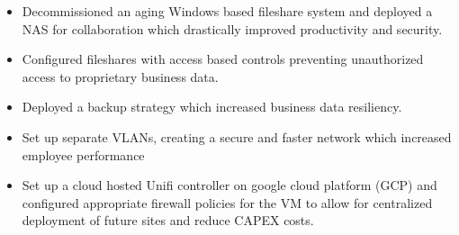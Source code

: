 \divider

\begin{itemize}
    \item Decommissioned an aging Windows based fileshare system and deployed a NAS for collaboration which drastically improved productivity and security.
    \item Configured fileshares with access based controls preventing unauthorized access to proprietary business data.
    \item Deployed a backup strategy which increased business data resiliency.
    \item Set up separate VLANs, creating a secure and faster network which increased employee performance
    \item Set up a cloud hosted Unifi controller on google cloud platform (GCP) and configured appropriate firewall policies for the VM to allow for centralized deployment of future sites and reduce CAPEX costs.
\end{itemize}
